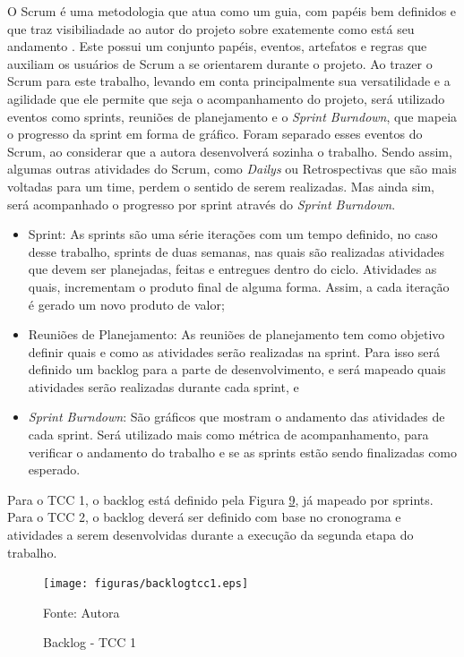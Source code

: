 O Scrum é uma metodologia que atua como um guia, com papéis bem definidos e que traz visibiliadade ao autor do projeto sobre 
exatemente como está seu andamento \cite{pereira2007entendendo}. Este possui um conjunto papéis, eventos, artefatos e regras
que auxiliam os usuários de Scrum a se orientarem durante o projeto. Ao trazer o Scrum para este trabalho, levando em conta principalmente
sua versatilidade e a agilidade que ele permite que seja o acompanhamento do projeto, será utilizado eventos como sprints, 
reuniões de planejamento e o \textit{Sprint Burndown}, que mapeia o progresso da sprint em forma de gráfico. Foram separado esses
eventos do Scrum, ao considerar que a autora desenvolverá sozinha o trabalho. Sendo assim, algumas outras atividades do Scrum, como
\textit{Dailys} ou Retrospectivas que são mais voltadas para um time, perdem o sentido de serem realizadas. Mas ainda sim, será
acompanhado o progresso por sprint através do \textit{Sprint Burndown}.

\begin{itemize}
    \item Sprint: As sprints são uma série iterações com um tempo definido, no caso desse trabalho, sprints de duas semanas, nas 
    quais são realizadas atividades que devem ser planejadas, feitas e entregues dentro do ciclo. Atividades as quais, incrementam
    o produto final de alguma forma. Assim, a cada iteração é gerado um novo produto de valor;   
    \item Reuniões de Planejamento: As reuniões de planejamento tem como objetivo definir quais e como as atividades serão realizadas
    na sprint. Para isso será definido um backlog para a parte de desenvolvimento, e será mapeado quais atividades serão realizadas
    durante cada sprint, e
    \item \textit{Sprint Burndown}: São gráficos que mostram o andamento das atividades de cada sprint. Será utilizado mais como
    métrica de acompanhamento, para verificar o andamento do trabalho e se as sprints estão sendo finalizadas como esperado.
\end{itemize}

Para o TCC 1, o backlog está definido pela Figura \hyperref[fig:backlogtcc1]{9}, já mapeado por sprints. Para o TCC 2, o backlog
deverá ser definido com base no cronograma e atividades a serem desenvolvidas durante a execução da segunda etapa do trabalho.

\begin{figure}[htbp]
    \centering
    \caption{Backlog - TCC 1}
    \label{fig:backlogtcc1}
    
    \vspace{2pt} %
    
    \texttt{[image: figuras/backlogtcc1.eps]}
    
    \vspace{2pt} %
    
    \small Fonte: Autora
\end{figure}

